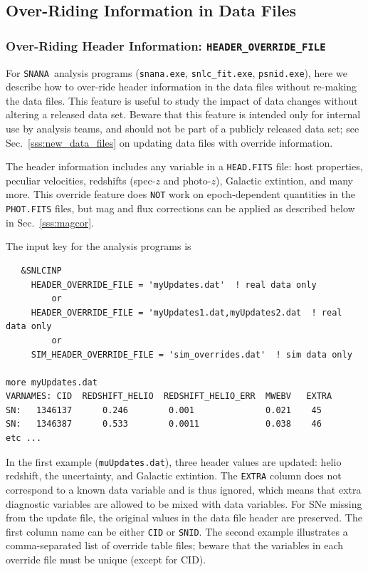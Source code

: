 \documentclass[12pt]{article}
\newcommand{\snana}{{\tt SNANA}}
\begin{document}
\clearpage
\subsection{Over-Riding Information in Data Files}
\label{subsec:data_override}


\subsubsection{Over-Riding Header Information: {\tt HEADER\_OVERRIDE\_FILE} }
\label{sss:header_override}

For \snana\ analysis programs 
({\tt snana.exe}, {\tt snlc\_fit.exe}, {\tt psnid.exe}),
here we describe how to over-ride header information in the
data files without re-making the data files.
This feature is useful to study the impact of data changes
without altering a released
data set. Beware that this feature is intended only for internal 
use by analysis teams,
and should not be part of a publicly released data set;
see Sec.~\ref{sss:new_data_files} on updating data files with 
override information.

The header information includes any variable in a {\tt *HEAD.FITS} file:
host properties, peculiar velocities, redshifts (spec-$z$ and photo-$z$), 
Galactic extintion, and many more.
This override feature does {\tt NOT} work
on epoch-dependent quantities in the {\tt *PHOT.FITS} files, 
but mag and flux corrections can be applied as described below in Sec.~\ref{sss:magcor}.

The input key for the analysis programs is
\begin{verbatim}
   &SNLCINP
     HEADER_OVERRIDE_FILE = 'myUpdates.dat'  ! real data only
         or
     HEADER_OVERRIDE_FILE = 'myUpdates1.dat,myUpdates2.dat  ! real data only
         or
     SIM_HEADER_OVERRIDE_FILE = 'sim_overrides.dat'  ! sim data only

more myUpdates.dat
VARNAMES: CID  REDSHIFT_HELIO  REDSHIFT_HELIO_ERR  MWEBV   EXTRA
SN:   1346137      0.246        0.001              0.021    45
SN:   1346387      0.533        0.0011             0.038    46
etc ...
\end{verbatim}

In the first example ({\tt muUpdates.dat}), three header values are updated:
helio redshift, the uncertainty, and Galactic extintion. The {\tt EXTRA} column
does not correspond to a known data variable and is thus ignored, which means
that extra diagnostic variables are allowed to be mixed with data variables.
For SNe missing from the update file, the original values in the 
data file header are preserved. 
The first column name can be either {\tt CID} or {\tt SNID}.
The second example illustrates a comma-separated list of override table files;
beware that the variables in each override file must be unique (except for CID).
\end{document}
